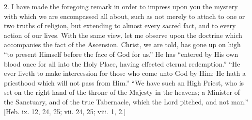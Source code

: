 2. I have made the foregoing remark in order to impress upon you the
mystery with which we are encompassed all about, such as not merely to
attach to one or two truths of religion, but extending to almost every
sacred fact, and to every action of our lives. With the same view, let
me observe upon the doctrine which accompanies the fact of the
Ascension. Christ, we are told, has gone up on high ``to present
Himself before the face of God for us.'' He has ``entered by His
own blood once for all into the Holy Place, having effected eternal
redemption.'' ``He ever liveth to make intercession for those
who come unto God by Him; He hath a priesthood which will not pass from
Him.'' ``We have such an High Priest, who is set on the right
hand of the throne of the Majesty in the heavens; a Minister of the
Sanctuary, and of the true Tabernacle, which the Lord pitched, and not
man.'' [Heb. ix. 12, 24, 25; vii. 24, 25; viii. 1, 2.]

